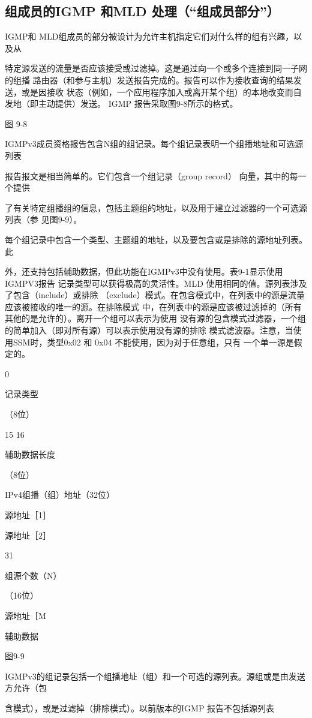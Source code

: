 \subsection{组成员的IGMP 和MLD 处理（“组成员部分”）}
IGMP和 MLD组成员的部分被设计为允许主机指定它们对什么样的组有兴趣，以及从

特定源发送的流量是否应该接受或过滤掉。这是通过向一个或多个连接到同一子网的组播
路由器（和参与主机）发送报告完成的。报告可以作为接收查询的结果发送，或是因接收
状态（例如，一个应用程序加入或离开某个组）的本地改变而自发地（即主动提供）发送。
IGMP 报告采取图9-8所示的格式。

图 9-8

IGMPv3成员资格报告包含N组的组记录。每个组记录表明一个组播地址和可选源列表

报告报文是相当简单的。它们包含一个组记录（group record） 向量，其中的每一个提供

了有关特定组播组的信息，包括主题组的地址，以及用于建立过滤器的一个可选源列表（参
见图9-9）。

每个组记录中包含一个类型、主题组的地址，以及要包含或是排除的源地址列表。此

外，还支持包括辅助数据，但此功能在IGMPv3中没有使用。表9-1显示使用IGMPV3报告
记录类型可以获得极高的灵活性。MLD 使用相同的值。源列表涉及了包含（include）或排除
（exclude）模式。在包含模式中，在列表中的源是流量应该被接收的唯一的源。在排除模式
中，在列表中的源是应该被过滤掉的（所有其他的是允许的）。离开一个组可以表示为使用
没有源的包含模式过滤器，一个组的简单加入（即对所有源）可以表示使用没有源的排除
模式滤波器。注意，当使用SSM时，类型0x02 和 0x04 不能使用，因为对于任意组，只有
一个单一源是假定的。

0

记录类型

（8位）

15 16

辅助数据长度

（8位）

IPv4组播（组）地址（32位）

源地址［1］

源地址［2］

31

组源个数（N）

（16位）

源地址［M

辅助数据

图9-9

IGMPv3的组记录包括一个组播地址（组）和一个可选的源列表。源组或是由发送方允许（包

含模式），或是过滤掉（排除模式）。以前版本的IGMP 报告不包括源列表


